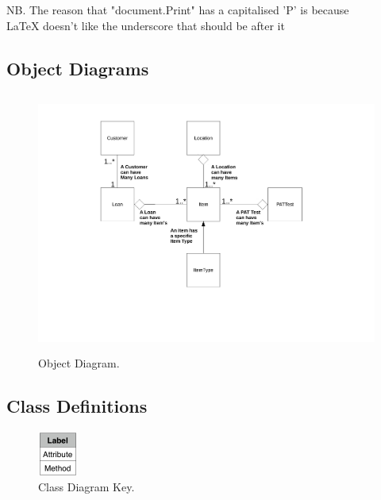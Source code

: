 \begin{center}
    NB. The reason that "document.Print" has a capitalised 'P' is because\\
    LaTeX doesn't like the underscore that should be after it
\end{center}

\begin{landscape}

\subsection{Object Diagrams}

\begin{figure}[H]
    \begin{center}
    \includegraphics[height=325px]{./Design/Object_Diagrams/Object_diagrams.pdf}
    \caption{Object Diagram.} \label{fig:object_diagram}
    \end{center}
\end{figure}

\newpage

\subsection{Class Definitions}

\begin{figure}[H]
    \centerline{\includegraphics[width=50px]{./Design/Class_Definitions/Class_definition_key.pdf}}
    \caption{Class Diagram Key.} \label{fig:relationship_diagram}
\end{figure}


\end{landscape}
